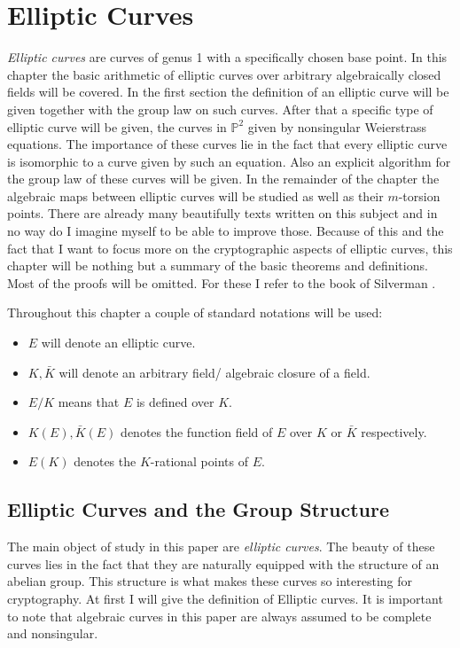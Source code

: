 \documentclass{article}
\numberwithin{equation}{section}
\theoremstyle{definition}
\newcommand{\proj}[1]{{\mathbb P}^{#1}} %
\begin{document}
\section{Elliptic Curves}\label{ellipticcurvesection}
\emph{Elliptic curves} are curves of genus 1 with a specifically chosen base point. In this chapter the basic arithmetic of elliptic curves over arbitrary algebraically closed fields will be covered. In the first section the definition of an elliptic curve will be given together with the group law on such curves. After that a specific type of elliptic curve will be given, the curves in $\proj{2}$ given by nonsingular Weierstrass equations. The importance of these curves lie in the fact that every elliptic curve is isomorphic to a curve given by such an equation. Also an explicit algorithm for the group law of these curves will be given. In the remainder of the chapter the algebraic maps between elliptic curves will be studied as well as their $m$-torsion points. There are already many beautifully texts written on this subject and in no way do I imagine myself to be able to improve those. Because of this and the fact that I want to focus more on the cryptographic aspects of elliptic curves, this chapter will be nothing but a summary of the basic theorems and definitions. Most of the proofs will be omitted. For these I refer to the book of Silverman \cite{Silverman}.\par 
Throughout this chapter a couple of standard notations will be used:
\begin{itemize}
\item $E$ will denote an elliptic curve.
\item $K , \bar{K}$ will denote an arbitrary field/ algebraic closure of a field.
\item $E/K$ means that $E$ is defined over $K$.
\item $K(E),\bar{K}(E)$ denotes the function field of $E$ over $K$ or $\bar{K}$ respectively.
\item $E(K)$ denotes the $K$-rational points of $E$. 
\end{itemize}



\subsection{Elliptic Curves and the Group Structure}\label{EllipticCurve}
The main object of study in this paper are \emph{elliptic curves}. The beauty of these curves lies in the fact that they are naturally equipped with the structure of an abelian group. This structure is what makes these curves so interesting for cryptography. At first I will give the definition of Elliptic curves. It is important to note that algebraic curves in this paper are always assumed to be complete and nonsingular.
\end{document}
